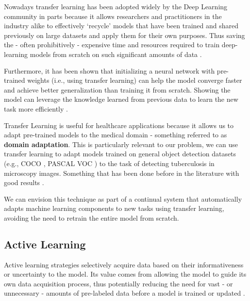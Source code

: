 \documentclass[../main.tex]{subfiles}
\begin{document}
     Nowadays transfer learning has been adopted widely by the Deep Learning community in parts because it allows researchers and practitioners in the industry alike to effectively `recycle' models that have been trained and shared previously on large datasets and apply them for their own purposes. Thus saving the - often prohibitively - expensive time and resources required to train deep-learning models from scratch on such significant amounts of data  \cite{yosinskiHowTransferableAre2014}.

     Furthermore, it has been shown that initializing a neural network with pre-trained weights (i.e., using transfer learning) can help the model converge faster and achieve better generalization than training it from scratch. Showing the model can leverage the knowledge learned from previous data to learn the new task more efficiently \cite{yosinskiHowTransferableAre2014}.

     Transfer Learning is useful for healthcare applications because it allows us to adapt pre-trained models to the medical domain - something referred to as \textbf{domain adaptation}. This is particularly relevant to our problem, we can use transfer learning to adapt models trained on general object detection datasets (e.g., COCO \cite{linMicrosoftCOCOCommon2015}, PASCAL VOC \cite{everinghamPascalVisualObject2010}) to the task of detecting tuberculosis in microscopy images. Something that has been done before in the literature with good results \cite{visuna_novel_2023}.

     We can envision this technique as part of a continual system that automatically adapts machine learning components to new tasks using transfer learning, avoiding the need to retrain the entire model from scratch.

	
    \subsection{Active Learning} \label{sec:active_learning} 
 
     Active learning strategies selectively acquire data based on their informativeness or uncertainty to the model. Its value comes from allowing the model to guide its own data acquisition process, thus potentially reducing the need for vast - or unnecessary - amounts of pre-labeled data before a model is trained or updated \cite{huyen_designing_2022, chen_study_2015, figueroa_predicting_2012}. 
     
\end{document}
